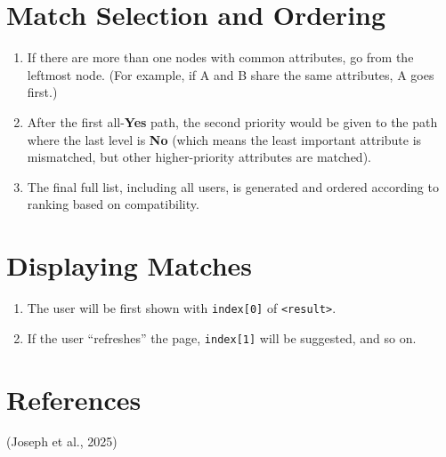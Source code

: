 \documentclass[fontsize=11pt]{article}
\begin{document}
\section{Match Selection and Ordering}
\begin{enumerate}
    \item If there are more than one nodes with common attributes, go from the leftmost node.  
    (For example, if A and B share the same attributes, A goes first.)
    \item After the first all-\textbf{Yes} path, the second priority would be given to the path where the last level is \textbf{No} (which means the least important attribute is mismatched, but other higher-priority attributes are matched).
    \item The final full list, including all users, is generated and ordered according to ranking based on compatibility.
\end{enumerate}

\section{Displaying Matches}
\begin{enumerate}
    \item The user will be first shown with \texttt{index[0]} of \texttt{<result>}.
    \item If the user “refreshes” the page, \texttt{index[1]} will be suggested, and so on.
\end{enumerate}

\section*{References}

(Joseph et al., 2025)

\end{document}

